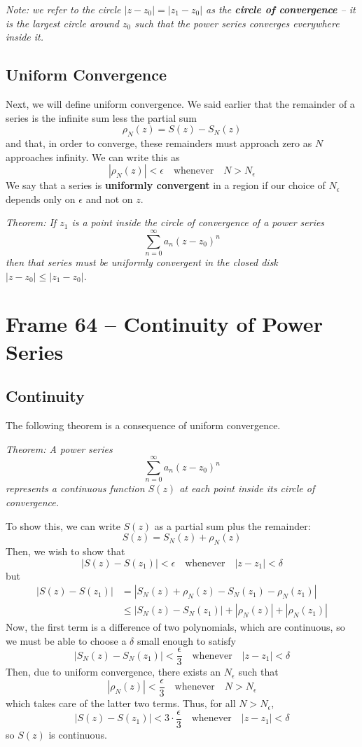 \documentclass{article}
\renewcommand{\emph}{\textbf}
\begin{document}
\textit{Note: we refer to the circle $|z - z_0| = |z_1 - z_0|$ as the \emph{circle of convergence} -- it is the largest circle around $z_0$ such that the power series converges everywhere inside it.}

\subsection{Uniform Convergence}
Next, we will define uniform convergence. We said earlier that the remainder of a series is the infinite sum less the partial sum
\[
	\rho_N(z) = S(z) - S_N(z)
\]
and that, in order to converge, these remainders must approach zero as $N$ approaches infinity. We can write this as
\[
	|\rho_N(z)| < \epsilon \quad \text{whenever} \quad N > N_\epsilon
\]
We say that a series is \emph{uniformly convergent} in a region if our choice of $N_\epsilon$ depends only on $\epsilon$ and not on $z$.

\textit{Theorem: If $z_1$ is a point inside the circle of convergence of a power series
\[
	\sum_{n=0}^\infty a_n (z - z_0)^n
\]
then that series must be uniformly convergent in the closed disk $|z - z_0| \le |z_1 - z_0|$.}


\clearpage
\section{Frame 64 -- Continuity of Power Series}
\subsection{Continuity}
The following theorem is a consequence of uniform convergence.

\textit{Theorem: A power series
\[
	\sum_{n=0}^\infty a_n (z - z_0)^n
\]
represents a continuous function $S(z)$ at each point inside its circle of convergence.}

To show this, we can write $S(z)$ as a partial sum plus the remainder:
\[
	S(z) = S_N(z) + \rho_N(z)
\]
Then, we wish to show that
\[
	|S(z) - S(z_1)| < \epsilon \quad \text{whenever} \quad |z - z_1| < \delta
\]
but
\begin{align*}
	|S(z) - S(z_1)| 
	&= |S_N(z) + \rho_N(z) - S_N(z_1) - \rho_N(z_1)| \\
	&\le |S_N(z) - S_N(z_1)| + |\rho_N(z)| + |\rho_N(z_1)|
\end{align*}
Now, the first term is a difference of two polynomials, which are continuous, so we must be able to choose a $\delta$ small enough to satisfy
\[
	|S_N(z) - S_N(z_1)| < \frac{\epsilon}{3} \quad \text{whenever} \quad |z - z_1| < \delta
\]
Then, due to uniform convergence, there exists an $N_\epsilon$ such that
\[
	|\rho_N(z)| < \frac{\epsilon}{3} \quad \text{whenever} \quad N > N_\epsilon
\]
which takes care of the latter two terms. Thus, for all $N > N_\epsilon$,
\[
	|S(z) - S(z_1)| < 3 \cdot \frac{\epsilon}{3} \quad \text{whenever} \quad
	|z - z_1| < \delta
\]
so $S(z)$ is continuous.
\end{document}
